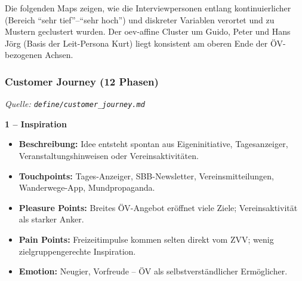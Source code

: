\medskip
Die folgenden Maps zeigen, wie die Interviewpersonen entlang kontinuierlicher
(Bereich \enquote{sehr tief}--\enquote{sehr hoch}) und diskreter Variablen verortet
und zu Mustern geclustert wurden. Der \gls{oev}-affine Cluster um Guido, Peter
und Hans Jörg (Basis der Leit-Persona Kurt) liegt konsistent am oberen Ende der
ÖV-bezogenen Achsen.

\clearpage
{}
\clearpage
{}
\clearpage
{}

\clearpage
\subsubsection{Customer Journey (12 Phasen)}
\textit{Quelle: \texttt{define/customer\_journey.md}}

\newcommand{\CJPhase}[6]{%
  \par\smallskip\noindent\textbf{#1}
  \begin{itemize}[nosep,leftmargin=1.4em]
    \item \textbf{Beschreibung:} #2
    \item \textbf{Touchpoints:} #3
    \item \textbf{Pleasure Points:} #4
    \item \textbf{Pain Points:} #5
    \item \textbf{Emotion:} #6
  \end{itemize}%
}

\CJPhase{1 -- Inspiration}
{Idee entsteht spontan aus Eigeninitiative, Tagesanzeiger, Veranstaltungshinweisen oder Vereinsaktivitäten.}
{Tages-Anzeiger, SBB-Newsletter, Vereinsmitteilungen, Wanderwege-App, Mundpropaganda.}
{Breites ÖV-Angebot eröffnet viele Ziele; Vereinsaktivität als starker Anker.}
{Freizeitimpulse kommen selten direkt vom ZVV; wenig zielgruppengerechte Inspiration.}
{Neugier, Vorfreude -- ÖV als selbstverständlicher Ermöglicher.}

